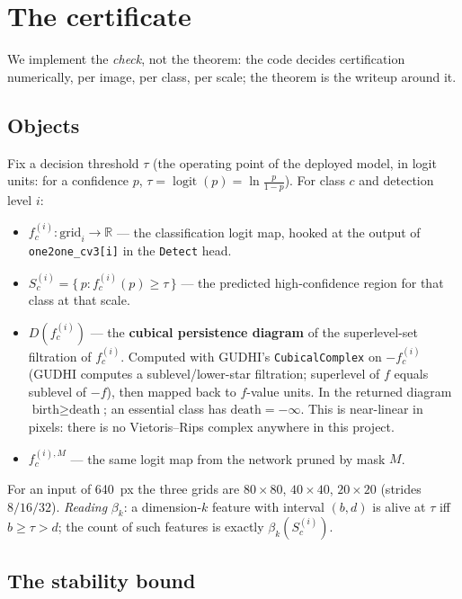 \documentclass[11pt]{article}
\newcommand{\code}[1]{\texttt{\small #1}}
\newcommand{\fc}{f_c^{(i)}}
\newcommand{\fcm}{f_c^{(i),M}}
\newcommand{\Betti}{\beta}
\newcommand{\R}{\mathbb{R}}
\theoremstyle{definition}
\theoremstyle{plain}
\begin{document}
\section{The certificate}
\label{sec:cert}

We implement the \emph{check}, not the theorem: the code decides certification
numerically, per image, per class, per scale; the theorem is the writeup around
it.

\subsection{Objects}

Fix a decision threshold $\tau$ (the operating point of the deployed model, in
logit units: for a confidence $p$, $\tau = \operatorname{logit}(p) =
\ln\frac{p}{1-p}$). For class $c$ and detection level $i$:

\begin{itemize}[leftmargin=1.5em]
\item $\fc : \text{grid}_i \to \R$ --- the classification logit map, hooked at
the output of \code{one2one\_cv3[i]} in the \code{Detect} head.
\item $S_c^{(i)} = \{\, p : \fc(p) \ge \tau \,\}$ --- the predicted
high-confidence region for that class at that scale.
\item $D(\fc)$ --- the \textbf{cubical persistence diagram} of the superlevel-set
filtration of $\fc$. Computed with GUDHI's \code{CubicalComplex} on $-\fc$ (GUDHI
computes a sublevel/lower-star filtration; superlevel of $f$ equals sublevel of
$-f$), then mapped back to $f$-value units. In the returned diagram
$\text{birth} \ge \text{death}$; an essential class has $\text{death} = -\infty$.
This is near-linear in pixels: there is no Vietoris--Rips complex anywhere in
this project.
\item $\fcm$ --- the same logit map from the network pruned by mask $M$.
\end{itemize}

For an input of \SI{640}{px} the three grids are $80\times80$, $40\times40$,
$20\times20$ (strides $8/16/32$). \emph{Reading} $\Betti_k$: a dimension-$k$
feature with interval $(b,d)$ is alive at $\tau$ iff $b \ge \tau > d$; the count
of such features is exactly $\Betti_k(S_c^{(i)})$.

\subsection{The stability bound}
\end{document}
